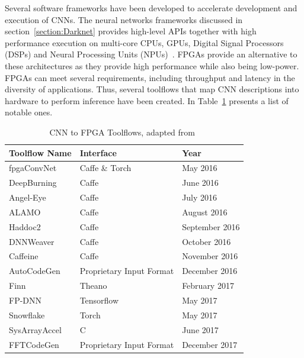     Several software frameworks have been developed to accelerate development and
    execution of CNNs. The neural networks frameworks discussed in
    section~\ref{section:Darknet} provides high-level APIs together with high
    performance execution on multi-core CPUs, GPUs, Digital Signal Processors (DSPs)
    and Neural Processing Units (NPUs)~\cite{smartphones}. FPGAs provide an
    alternative to these architectures as they provide high performance while also
    being low-power. FPGAs can meet several requirements, including throughput and latency
    in the diversity of applications. Thus, several toolflows that map CNN descriptions
    into hardware to perform inference have been created. In
    Table~\ref{table:toolflow} presents a list of notable ones.
    \begin{table}[!htpb]
        \centering
        \begin{tabular}{lll}
        \hline
        \textbf{Toolflow Name} & \textbf{Interface}       & \textbf{Year}  \\ \hline
        fpgaConvNet            & Caffe \& Torch           & May 2016       \\
        DeepBurning            & Caffe                    & June 2016      \\
        Angel-Eye              & Caffe                    & July 2016      \\
        ALAMO                  & Caffe                    & August 2016    \\
        Haddoc2                & Caffe                    & September 2016 \\
        DNNWeaver              & Caffe                    & October 2016   \\
        Caffeine               & Caffe                    & November 2016  \\
        AutoCodeGen            & Proprietary Input Format & December 2016  \\
        Finn                   & Theano                   & February 2017  \\
        FP-DNN                 & Tensorflow               & May 2017       \\
        Snowflake              & Torch                    & May 2017       \\
        SysArrayAccel          & C                        & June 2017      \\
        FFTCodeGen             & Proprietary Input Format & December 2017  \\ \hline
        \end{tabular}
        \label{table:toolflow}
        \caption{CNN to FPGA Toolflows, adapted from~\cite{misc:cnntofpga}}
    \end{table}


